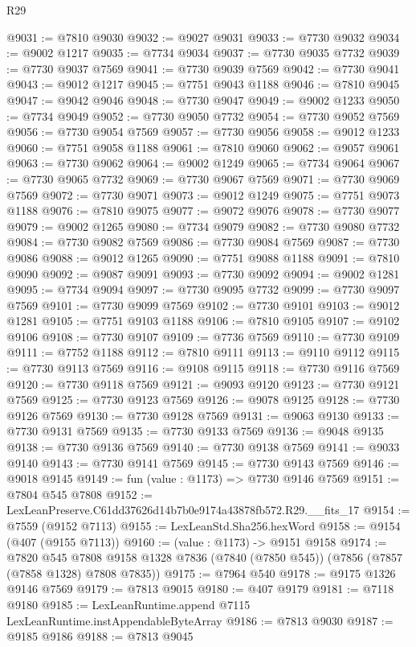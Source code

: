 \begin{lexlean}{R29}
\begin{coremodule}
@9031 := @7810 @9030
@9032 := @9027 @9031
@9033 := @7730 @9032
@9034 := @9002 @1217
@9035 := @7734 @9034
@9037 := @7730 @9035 @7732
@9039 := @7730 @9037 @7569
@9041 := @7730 @9039 @7569
@9042 := @7730 @9041
@9043 := @9012 @1217
@9045 := @7751 @9043 @1188
@9046 := @7810 @9045
@9047 := @9042 @9046
@9048 := @7730 @9047
@9049 := @9002 @1233
@9050 := @7734 @9049
@9052 := @7730 @9050 @7732
@9054 := @7730 @9052 @7569
@9056 := @7730 @9054 @7569
@9057 := @7730 @9056
@9058 := @9012 @1233
@9060 := @7751 @9058 @1188
@9061 := @7810 @9060
@9062 := @9057 @9061
@9063 := @7730 @9062
@9064 := @9002 @1249
@9065 := @7734 @9064
@9067 := @7730 @9065 @7732
@9069 := @7730 @9067 @7569
@9071 := @7730 @9069 @7569
@9072 := @7730 @9071
@9073 := @9012 @1249
@9075 := @7751 @9073 @1188
@9076 := @7810 @9075
@9077 := @9072 @9076
@9078 := @7730 @9077
@9079 := @9002 @1265
@9080 := @7734 @9079
@9082 := @7730 @9080 @7732
@9084 := @7730 @9082 @7569
@9086 := @7730 @9084 @7569
@9087 := @7730 @9086
@9088 := @9012 @1265
@9090 := @7751 @9088 @1188
@9091 := @7810 @9090
@9092 := @9087 @9091
@9093 := @7730 @9092
@9094 := @9002 @1281
@9095 := @7734 @9094
@9097 := @7730 @9095 @7732
@9099 := @7730 @9097 @7569
@9101 := @7730 @9099 @7569
@9102 := @7730 @9101
@9103 := @9012 @1281
@9105 := @7751 @9103 @1188
@9106 := @7810 @9105
@9107 := @9102 @9106
@9108 := @7730 @9107
@9109 := @7736 @7569
@9110 := @7730 @9109
@9111 := @7752 @1188
@9112 := @7810 @9111
@9113 := @9110 @9112
@9115 := @7730 @9113 @7569
@9116 := @9108 @9115
@9118 := @7730 @9116 @7569
@9120 := @7730 @9118 @7569
@9121 := @9093 @9120
@9123 := @7730 @9121 @7569
@9125 := @7730 @9123 @7569
@9126 := @9078 @9125
@9128 := @7730 @9126 @7569
@9130 := @7730 @9128 @7569
@9131 := @9063 @9130
@9133 := @7730 @9131 @7569
@9135 := @7730 @9133 @7569
@9136 := @9048 @9135
@9138 := @7730 @9136 @7569
@9140 := @7730 @9138 @7569
@9141 := @9033 @9140
@9143 := @7730 @9141 @7569
@9145 := @7730 @9143 @7569
@9146 := @9018 @9145
@9149 := fun (value : @1173) => @7730 @9146 @7569
@9151 := @7804 @545 @7808
@9152 := LexLeanPreserve.C61dd37626d14b7b0e9174a43878fb572.R29.__fits_17
@9154 := @7559 (@9152 @7113)
@9155 := LexLeanStd.Sha256.hexWord
@9158 := @9154 (@407 (@9155 @7113))
@9160 := (value : @1173) -> @9151 @9158
@9174 := @7820
    @545
    @7808
    @9158
    @1328
    @7836
    (@7840 (@7850 @545))
    (@7856 (@7857 (@7858 @1328) @7808 @7835))
@9175 := @7964 @540
@9178 := @9175 @1326 @9146 @7569
@9179 := @7813 @9015
@9180 := @407 @9179
@9181 := @7118 @9180
@9185 := LexLeanRuntime.append @7115 LexLeanRuntime.instAppendableByteArray
@9186 := @7813 @9030
@9187 := @9185 @9186
@9188 := @7813 @9045

\end{coremodule}
\end{lexlean}
